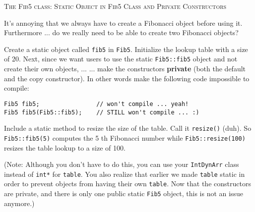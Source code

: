\textsc{The Fib5 class: Static Object in Fib5 Class and Private Constructors}

It's annoying that we always have to create a Fibonacci object before using it. Furthermore ... do we
really need to be able to create two Fibonacci objects?

Create a static object called \verb!fib5! in \texttt{Fib5}. Initialize the lookup table with a size of 20. Next, since we
want users to use the static \texttt{Fib5::fib5} object and not create their own objects, ... 
 ... make the constructors \textbf{private} (both the default and the copy constructor). In other words
make the following code impossible to compile:

\begin{Verbatim}[frame=single]
Fib5 fib5;                // won't compile ... yeah!
Fib5 fib5(Fib5::fib5);    // STILL won't compile ... :)
\end{Verbatim}

Include a static method to resize the size of the table. Call it \texttt{resize()} (duh). So \texttt{Fib5::fib5(5)}
computes the 5 th Fibonacci number while \texttt{Fib5::resize(100)} resizes the table lookup to a size of
100.

(Note: Although you don't have to do this, you can use your \texttt{IntDynArr} class instead of \verb!int*! for
\verb!table!. You also realize that earlier we made \verb!table! static in order to prevent objects from having
their own \verb!table!. Now that the constructors are private, and there is only one public static \texttt{Fib5}
object, this is not an issue anymore.)


